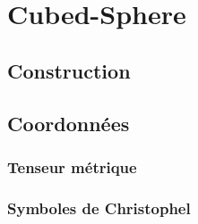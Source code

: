 \chapter{Cubed-Sphere}

\section{Construction}

\section{Coordonnées}

\subsection{Tenseur métrique}

\subsection{Symboles de Christophel}